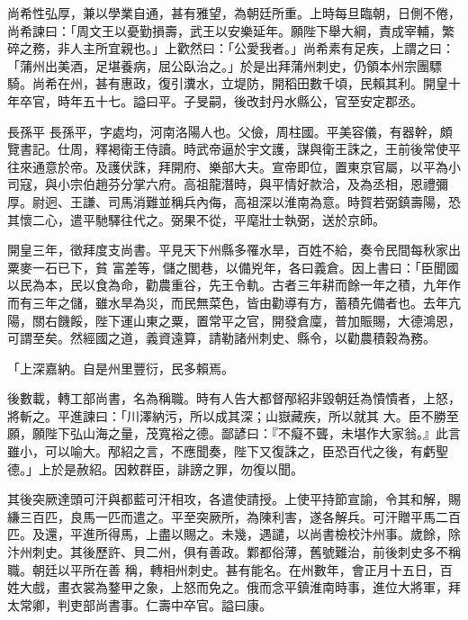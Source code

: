 \begin{pinyinscope}
 尚希性弘厚，兼以學業自通，甚有雅望，為朝廷所重。上時每旦臨朝，日側不倦，尚希諫曰：「周文王以憂勤損壽，武王以安樂延年。願陛下舉大綱，責成宰輔，繁碎之務，非人主所宜親也。」上歡然曰：「公愛我者。」尚希素有足疾，上謂之曰：「蒲州出美酒，足堪養病，屈公臥治之。」於是出拜蒲州刺史，仍領本州宗團驃騎。尚希在州，甚有惠政，復引瀵水，立堤防，開稻田數千頃，民賴其利。開皇十年卒官，時年五十七。謚曰平。子旻嗣，後改封丹水縣公，官至安定郡丞。



 長孫平
 長孫平，字處均，河南洛陽人也。父儉，周柱國。平美容儀，有器幹，頗覽書記。仕周，釋褐衛王侍讀。時武帝逼於宇文護，謀與衛王誅之，王前後常使平往來通意於帝。及護伏誅，拜開府、樂部大夫。宣帝即位，置東京官屬，以平為小司寇，與小宗伯趙芬分掌六府。高祖龍潛時，與平情好款洽，及為丞相，恩禮彌厚。尉迥、王謙、司馬消難並稱兵內侮，高祖深以淮南為意。時賀若弼鎮壽陽，恐其懷二心，遣平馳驛往代之。弼果不從，平麾壯士執弼，送於京師。



 開皇三年，徵拜度支尚書。平見天下州縣多罹水旱，百姓不給，奏令民間每秋家出粟麥一石已下，貧
 富差等，儲之閭巷，以備兇年，各曰義倉。因上書曰：「臣聞國以民為本，民以食為命，勸農重谷，先王令軌。古者三年耕而餘一年之積，九年作而有三年之儲，雖水旱為災，而民無菜色，皆由勸導有方，蓄積先備者也。去年亢陽，關右饑餒，陛下運山東之粟，置常平之官，開發倉廩，普加賑賜，大德鴻恩，可謂至矣。然經國之道，義資遠算，請勒諸州刺史、縣令，以勸農積穀為務。



 「上深嘉納。自是州里豐衍，民多賴焉。



 後數載，轉工部尚書，名為稱職。時有人告大都督邴紹非毀朝廷為憒憒者，上怒，將斬之。平進諫曰：「川澤納污，所以成其深；山嶽藏疾，所以就其
 大。臣不勝至願，願陛下弘山海之量，茂寬裕之德。鄙諺曰：『不癡不聾，未堪作大家翁。』此言雖小，可以喻大。邴紹之言，不應聞奏，陛下又復誅之，臣恐百代之後，有虧聖德。」上於是赦紹。因敕群臣，誹謗之罪，勿復以聞。



 其後突厥達頭可汗與都藍可汗相攻，各遣使請授。上使平持節宣諭，令其和解，賜縑三百匹，良馬一匹而遣之。平至突厥所，為陳利害，遂各解兵。可汗贈平馬二百匹。及還，平進所得馬，上盡以賜之。未幾，遇譴，以尚書檢校汴州事。歲餘，除汴州刺史。其後歷許、貝二州，俱有善政。鄴都俗薄，舊號難治，前後刺史多不稱職。朝廷以平所在善
 稱，轉相州刺史。甚有能名。在州數年，會正月十五日，百姓大戲，畫衣裳為鍪甲之象，上怒而免之。俄而念平鎮淮南時事，進位大將軍，拜太常卿，判吏部尚書事。仁壽中卒官。謚曰康。




\end{pinyinscope}
